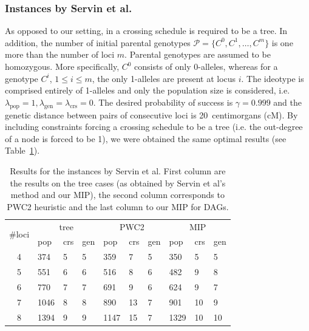 \documentclass[runningheads]{llncs}
\begin{document}
\subsubsection{Instances by Servin et al.}

As opposed to our setting, in \cite{Servin:2004} a crossing schedule is required to be a tree. In addition,
 the number of initial parental genotypes $\mathcal{P} = \{ C^0, C^1,\ldots, C^m \}$ is one more than the number of loci $m$. Parental genotypes are assumed to be homozygous. More specifically, $C^0$ consists of only 0-alleles, whereas for a genotype $C^i$, $1 \leq i \leq m$, the only 1-alleles are present at locus $i$. The ideotype is comprised entirely of 1-alleles and only the population size is considered, i.e.\ $\lambda_\mathrm{pop} = 1, \lambda_\mathrm{gen} = \lambda_\mathrm{crs} = 0$. 
The desired probability of success is $\gamma=0.999$ and the genetic distance between pairs of consecutive loci is 20~centimorgans (cM). By including constraints forcing a crossing schedule to be a tree (i.e. the out-degree of a node is forced to be 1), we were obtained the same optimal results (see Table~\ref{tbl:servin}).

\begin{table}
  \center
    \small\begin{tabular}{|c||lll|lll|lll|}
    \hline
    \multirow{2}{*}{\#loci} & \multicolumn{3}{c|}{tree} & \multicolumn{3}{c|}{PWC2} & \multicolumn{3}{c|}{MIP}\\
           & pop & crs & gen & pop & crs & gen & pop & crs & gen\\
    \hline
    4 & 374  & 5 & 5 & 359  & 7 & 5 & 350  & 5 & 5\\
    5 & 551  & 6 & 6 & 516  & 8 & 6 & 482  & 9 & 8\\
    6 & 770  & 7 & 7 & 691  & 9 & 6 & 624  & 9 & 7\\
    7 & 1046 & 8 & 8 & 890  &13 & 7 & 901  &10 & 9\\
    8 & 1394 & 9 & 9 & 1147 &15 & 7 & 1329 &10 &10\\
    \hline
    \end{tabular}
  \caption{Results for the instances by Servin et al. First column are the results on the tree cases (as obtained by Servin et al's method and our MIP), the second column corresponds to PWC2 heuristic and the last column to our MIP for DAGs.}
  \label{tbl:servin}
\end{table}
\end{document}
